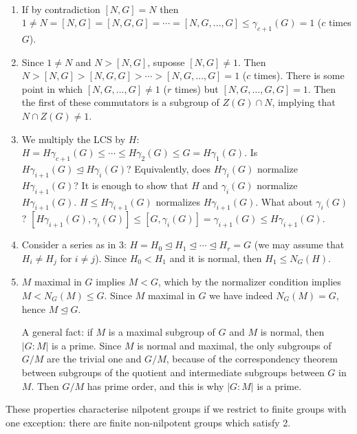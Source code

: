 \documentclass[twoside, 11pt]{article}
\begin{document}
\begin{dem}\
\begin{enumerate}
\item If by contradiction $[N,G]=N$ then $1\neq N=[N,G]=[N,G,G]=\cdots=[N,G,\dots, G]\leq \gamma_{c+1}(G)=1$ ($c$ times $G$). 
\item Since $1\neq N$ and $N>[N,G]$, suposse $[N,G]\neq 1$. Then $N>[N,G]>[N,G,G]>\cdots>[N,G,\dots,G]=1$ ($c$ times). There is some point in which $[N,G,\dots, G]\neq 1$  ($r$ times) but $[N,G,\dots, G,G]=1$. Then the first of these commutators is a subgroup of $Z(G)\cap N$, implying that $N\cap Z(G)\neq 1$.
\item We multiply the LCS by $H$: $H=H\gamma_{c+1}(G)\leq\cdots\leq H\gamma_2(G)\leq G=H\gamma_1(G)$. Is $H\gamma_{i+1}(G)\trianglelefteq H\gamma_i(G)$? Equivalently, does $H\gamma_i(G)$ normalize $H\gamma_{i+1}(G)$? It is enough to show that $H$ and $\gamma_i(G)$ normalize $H\gamma_{i+1}(G)$. $H\leq H\gamma_{i+1}(G)$ normalizes $H\gamma_{i+1}(G)$. What about $\gamma_i(G)$? $[H\gamma_{i+1}(G),\gamma_i(G)]\leq [G,\gamma_i(G)]=\gamma_{i+1}(G)\leq H\gamma_{i+1}(G)$. 

\item Consider a series as in 3: $H=H_0\trianglelefteq H_1\trianglelefteq\cdots\trianglelefteq H_r=G$ (we may assume that $H_i\neq H_j$ for $i\neq j$). Since $H_0<H_1$ and it is normal, then $H_1\leq N_G(H)$.  
\item $M$ maximal in $G$ implies $M<G$, which by the normalizer condition implies $M<N_G(M)\leq G$. Since $M$ maximal in $G$ we have indeed $N_G(M)=G$, hence $M\trianglelefteq G$. 

A general fact: if $M$ is a maximal subgroup of $G$ and $M$ is normal, then $|G:M|$ is a prime. Since $M$ is normal and maximal, the only subgroups of $G/M$ are the trivial one and $G/M$, because of the correspondency theorem between subgroups of the quotient and intermediate subgroups between $G$ in $M$. Then $G/M$ has prime order, and this is why $|G:M|$ is a prime. 
\end{enumerate}
\end{dem}

These properties characterise nilpotent groups if we restrict to finite groups with one exception: there are finite non-nilpotent groups which satisfy 2. 
\end{document}
